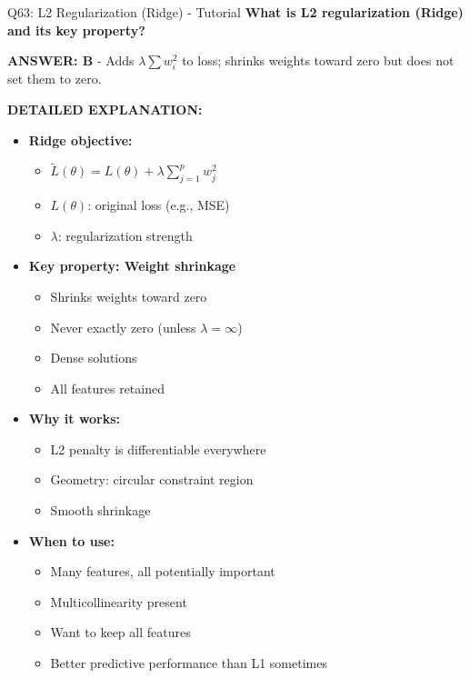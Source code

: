 \documentclass[8pt]{beamer}
\begin{document}
	\begin{frame}{Q63: L2 Regularization (Ridge) - Tutorial}
		\fontsize{6.5}{7.5}\selectfont
		\textbf{What is L2 regularization (Ridge) and its key property?}
		
		\vspace{0.05cm}
		\textcolor{myblue}{\textbf{ANSWER: B}} - Adds $\lambda \sum w_i^2$ to loss; shrinks weights toward zero but does not set them to zero.
		
		\vspace{0.05cm}
		\textbf{DETAILED EXPLANATION:}
		\begin{itemize}
			\item \textbf{Ridge objective:}
			\begin{itemize}
				\item $\tilde{L}(\theta) = L(\theta) + \lambda \sum_{j=1}^p w_j^2$
				\item $L(\theta)$: original loss (e.g., MSE)
				\item $\lambda$: regularization strength
			\end{itemize}
			\item \textbf{Key property: Weight shrinkage}
			\begin{itemize}
				\item Shrinks weights toward zero
				\item Never exactly zero (unless $\lambda = \infty$)
				\item Dense solutions
				\item All features retained
			\end{itemize}
			\item \textbf{Why it works:}
			\begin{itemize}
				\item L2 penalty is differentiable everywhere
				\item Geometry: circular constraint region
				\item Smooth shrinkage
			\end{itemize}
			\item \textbf{When to use:}
			\begin{itemize}
				\item Many features, all potentially important
				\item Multicollinearity present
				\item Want to keep all features
				\item Better predictive performance than L1 sometimes
			\end{itemize}
		\end{itemize}
		

\end{frame}
\end{document}
